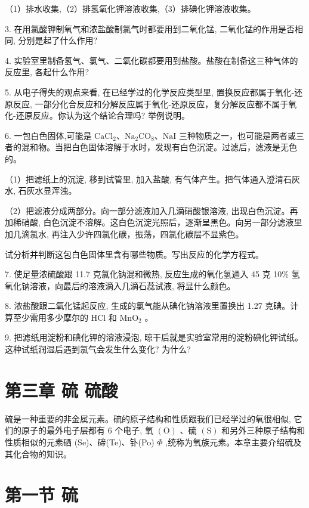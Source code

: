 \documentclass[10pt]{article}
\begin{document}
（1）排水收集,（2）排氢氧化钾溶液收集,（3）排碘化钾溶液收集。

3. 在用氯酸钾制氧气和浓盐酸制氯气时都要用到二氧化锰, 二氧化锰的作用是否相同, 分别是起了什么作用?

4. 实验室里制备氢气、氯气、二氧化碳都要用到盐酸。盐酸在制备这三种气体的反应里, 各起什么作用?

5. 从电子得失的观点来看, 在已经学过的化学反应类型里, 置换反应都属于氧化-还原反应, 一部分化合反应和分解反应属于氧化-还原反应，复分解反应都不属于氧化-还原反应。你认为这个结论合理吗? 举例说明。

6. 一包白色固体,可能是 \({\mathrm{{CaCl}}}_{2}\text{、}{\mathrm{{Na}}}_{2}{\mathrm{{CO}}}_{8}\text{、}\mathrm{{NaI}}\) 三种物质之一，也可能是两者或三者的混和物。当把白色固体溶解于水时，发现有白色沉淀。过滤后，滤液是无色的。

（1）把滤纸上的沉淀, 移到试管里, 加入盐酸, 有气体产生。把气体通入澄清石灰水, 石灰水显浑浊。

（2）把滤液分成两部分。向一部分滤液加入几滴硝酸银溶液, 出现白色沉淀。再加稀硝酸, 白色沉淀不溶解。这白色沉淀光照后，逐渐呈黑色。向另一部分滤液里加几滴氯水, 再注入少许四氯化碳，振荡，四氯化碳层不显紫色。

试分析并判断这包白色固体里含有哪些物质。写出反应的化学方程式。

7. 使足量浓硫酸跟 11.7 克氯化钠混和微热, 反应生成的氧化氢通入 45 克 10\% 氢氧化钠溶液，向最后的溶液滴入几滴石蕊试液, 将显什么颜色。

8. 浓盐酸跟二氧化锰起反应, 生成的氯气能从碘化钠溶液里置换出 1.27 克碘。计算至少需用多少摩尔的 \(\mathrm{{HCl}}\) 和 \({\mathrm{{MnO}}}_{2}\) 。

9. 把滤纸用淀粉和碘化钾的溶液浸泡, 晾干后就是实验室常用的淀粉碘化钾试纸。这种试纸润湿后遇到氯气会发生什么变化? 为什么?

\section*{第三章 硫 硫酸}

硫是一种重要的非金属元素。硫的原子结构和性质跟我们已经学过的氧很相似, 它们的原子的最外电子层都有 6 个电子, 氧 \(\left( \mathrm{O}\right)\) 、硫 \(\left( \mathrm{S}\right)\) 和另外三种原子结构和性质相似的元素硒 (Se)、碲(Te)、钋(Po) \(\Phi\) ,统称为氧族元素。本章主要介绍硫及其化合物的知识。

\section*{第一节 硫}
\end{document}
